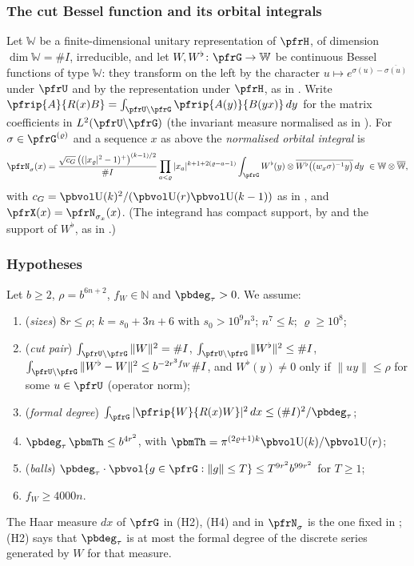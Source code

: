 \documentclass[10pt]{amsart}
\theoremstyle{definition}
\theoremstyle{remark}
\newcommand{\N}{\mathbb N}
\providecommand{\auU}{\mathrm U}
\begin{document}
\subsubsection*{The cut Bessel function and its orbital integrals}
Let $\mathbb W$ be a finite-dimensional unitary representation of $\pfrH$, of dimension $\dim\mathbb W=\#I$,
irreducible, and let $W,W^\flat\colon\pfrG\to\mathbb W$ be continuous Bessel functions of type $\mathbb W$: they transform on the left by the
character $u\mapsto e^{\sigma(u)-\overline{\sigma(u)}}$ under $\pfrU$ and by the representation under $\pfrH$, as in
{\cite[Definition~2.16]{P51}}. Write $\pfrip{A}{R(x)B}=\int_{\pfrU\backslash\pfrG}\pfrip{A(y)}{B(yx)}\,dy$ for
the matrix coefficients in $L^2(\pfrU\backslash\pfrG)$ (the invariant measure normalised as in
{\cite[\S3.2.1]{P51}}). For $\sigma\in\pfrG^{(\varrho)}$ and a sequence $x$ as above the \emph{normalised
orbital integral} is
\[
\pfrN_\sigma(x)=\frac{\sqrt{c_G}\,\bigl((|x_\varrho|^2-1)^+\bigr)^{(k-1)/2}}{\#I}\prod_{a<\varrho}|x_a|^{k+1+2(\varrho-a-1)}
\int_\pfrG W^\flat(y)\otimes\overline{W^\flat\bigl((w_x\sigma)^{-1}y\bigr)}\,dy\ \in\mathbb W\otimes\overline{\mathbb W},
\]
with $c_G=\pbvol\auU(k)^2/(\pbvol\auU(r)\pbvol\auU(k-1))$ as in {\cite[\S3.3.4]{P51}}, and
$\pfrX(x)=\pfrN_{\sigma_x}(x)$. (The integrand has compact support, by {\cite[Proposition~3.41]{P51}}
and the support of $W^\flat$, as in {\cite[\S3.3.2]{P51}}.)

\subsubsection*{Hypotheses}
Let $b\ge2$, $\rho=b^{6n+2}$, $f_W\in\N$ and $\pbdeg_\tau>0$. We assume:
\begin{enumerate}
\item[(H0)] (\emph{sizes}) $8r\le\rho$; $k=s_0+3n+6$ with $s_0>10^9n^3$; $n^7\le k$; $\varrho\ge10^8$;
\item[(H1)] (\emph{cut pair}) $\int_{\pfrU\backslash\pfrG}\|W\|^2=\#I$, $\int_{\pfrU\backslash\pfrG}\|W^\flat\|^2\le\#I$,
$\int_{\pfrU\backslash\pfrG}\|W^\flat-W\|^2\le b^{-2r^3f_W}\#I$, and $W^\flat(y)\ne0$ only if
$\|uy\|\le\rho$ for some $u\in\pfrU$ (operator norm);
\item[(H2)] (\emph{formal degree}) $\int_\pfrG|\pfrip{W}{R(x)W}|^2\,dx\le(\#I)^2/\pbdeg_\tau$;
\item[(H3)] $\pbdeg_\tau\,\pbmTh\le b^{4r^2}$, with $\pbmTh=\pi^{(2\varrho+1)k}\pbvol\auU(k)/\pbvol\auU(r)$;
\item[(H4)] (\emph{balls}) $\pbdeg_\tau\cdot\pbvol\{g\in\pfrG:\|g\|\le T\}\le T^{9r^2}b^{99r^2}$ for $T\ge1$;
\item[(H5)] $f_W\ge4000n$.
\end{enumerate}
The Haar measure $dx$ of $\pfrG$ in (H2), (H4) and in $\pfrN_\sigma$ is the one fixed in
{\cite[\S3.2.1]{P51}}; (H2) says that $\pbdeg_\tau$ is at most the formal degree of the discrete series
generated by $W$ for that measure.
\end{document}
